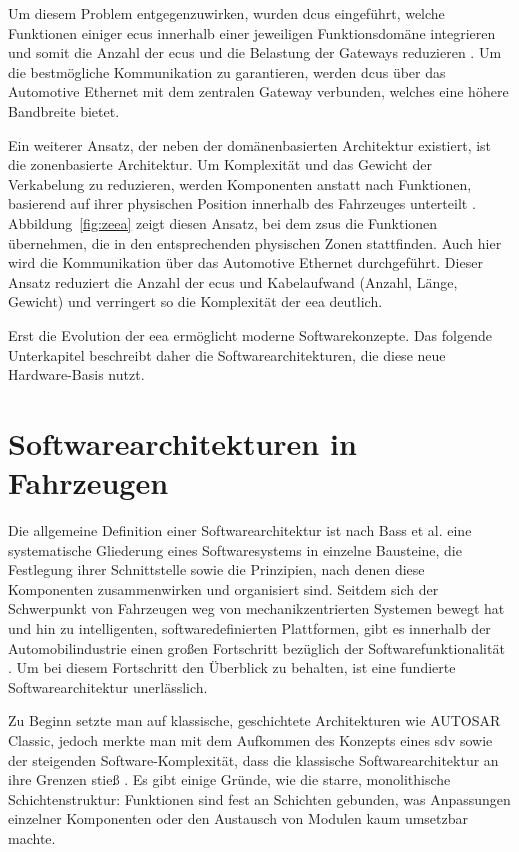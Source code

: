Um diesem Problem entgegenzuwirken, wurden \glspl{dcu} eingeführt, welche Funktionen einiger \glspl{ecu} innerhalb einer jeweiligen Funktionsdomäne integrieren und somit die Anzahl der \glspl{ecu} und die Belastung der Gateways reduzieren \cite{bandur2021making}\cite{jiang2019vehicle}\cite{wang2024review}. Um die bestmögliche Kommunikation zu garantieren, werden \glspl{dcu} über das Automotive Ethernet mit dem zentralen Gateway verbunden, welches eine höhere Bandbreite bietet.

Ein weiterer Ansatz, der neben der domänenbasierten Architektur existiert, ist die zonenbasierte Architektur. Um Komplexität und das Gewicht der Verkabelung zu reduzieren, werden Komponenten anstatt nach Funktionen, basierend auf ihrer physischen Position innerhalb des Fahrzeuges unterteilt \cite{wang2024review}\cite{jiang2019vehicle}. Abbildung~\ref{fig:zeea} zeigt diesen Ansatz, bei dem \glspl{zsu} die Funktionen übernehmen, die in den entsprechenden physischen Zonen stattfinden. Auch hier wird die Kommunikation über das Automotive Ethernet durchgeführt. Dieser Ansatz reduziert die Anzahl der \glspl{ecu} und Kabelaufwand (Anzahl, Länge, Gewicht) und verringert so die Komplexität der \gls{eea} deutlich.

Erst die Evolution der \gls{eea} ermöglicht moderne Softwarekonzepte. Das folgende Unterkapitel beschreibt daher die Softwarearchitekturen, die diese neue Hardware-Basis nutzt.

\section{Softwarearchitekturen in Fahrzeugen}
\label{sect:sa}
Die allgemeine Definition einer Softwarearchitektur ist nach Bass et al. \cite{bass2021} eine systematische Gliederung eines Softwaresystems in einzelne Bausteine, die Festlegung ihrer Schnittstelle sowie die Prinzipien, nach denen diese Komponenten zusammenwirken und organisiert sind. Seitdem sich der Schwerpunkt von Fahrzeugen weg von mechanikzentrierten Systemen bewegt hat und hin zu intelligenten, softwaredefinierten Plattformen, gibt es innerhalb der Automobilindustrie einen großen Fortschritt bezüglich der Softwarefunktionalität \cite{rumezOverviewAutomotiveServiceOriented2020}\cite{broy2006}. Um bei diesem Fortschritt den Überblick zu behalten, ist eine fundierte Softwarearchitektur unerlässlich.

Zu Beginn setzte man auf klassische, geschichtete Architekturen wie AUTOSAR Classic, jedoch merkte man mit dem Aufkommen des Konzepts eines \gls{sdv} sowie der steigenden Software-Komplexität, dass die klassische Softwarearchitektur an ihre Grenzen stieß  \cite{rumezOverviewAutomotiveServiceOriented2020}. Es gibt einige Gründe, wie die starre, monolithische Schichtenstruktur: Funktionen sind fest an Schichten gebunden, was Anpassungen einzelner Komponenten oder den Austausch von Modulen kaum umsetzbar machte.

